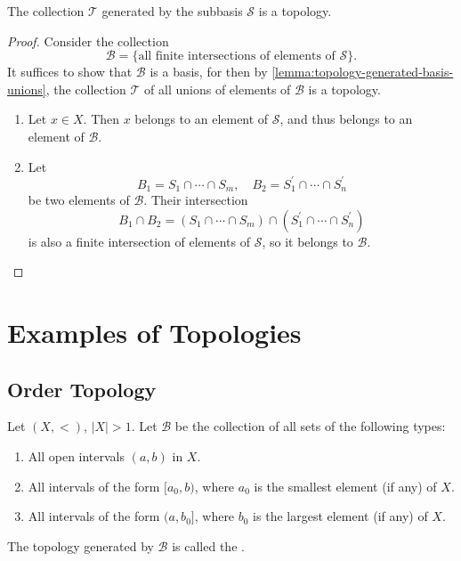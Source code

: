 \begin{lemma*}
The collection $\mathcal{T}$ generated by the subbasis $\mathcal{S}$ is a topology.
\end{lemma*}

\begin{proof}
Consider the collection
\[\mathcal{B}=\{\text{all finite intersections of elements of }\mathcal{S}\}.\]
It suffices to show that $\mathcal{B}$ is a basis, for then by \ref{lemma:topology-generated-basis-unions}, the collection $\mathcal{T}$ of all unions of elements of $\mathcal{B}$ is a topology.
\begin{enumerate}[label=(\roman*)]
\item Let $x\in X$. Then $x$ belongs to an element of $\mathcal{S}$, and thus belongs to an element of $\mathcal{B}$.
\item Let
\[B_1=S_1\cap\cdots\cap S_m,\quad B_2=S_1^\prime\cap\cdots\cap S_n^\prime\]
be two elements of $\mathcal{B}$. Their intersection
\[B_1\cap B_2=(S_1\cap\cdots\cap S_m)\cap(S_1^\prime\cap\cdots\cap S_n^\prime)\]
is also a finite intersection of elements of $\mathcal{S}$, so it belongs to $\mathcal{B}$.
\end{enumerate}
\end{proof}
\pagebreak

\section{Examples of Topologies}
\subsection{Order Topology}
\begin{definition}
Let $(X,<)$, $|X|>1$. Let $\mathcal{B}$ be the collection of all sets of the following types:
\begin{enumerate}[label=(\roman*)]
\item All open intervals $(a,b)$ in $X$.
\item All intervals of the form $[a_0,b)$, where $a_0$ is the smallest element (if any) of $X$.
\item All intervals of the form $(a,b_0]$, where $b_0$ is the largest element (if any) of $X$.
\end{enumerate}
The topology generated by $\mathcal{B}$ is called the .
\end{definition}

